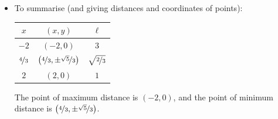 \begin{eg}
\begin{itemize}
\item To summarise (and giving distances and coordinates of points):
\begin{center}
           \renewcommand{\arraystretch}{1.5}
     \begin{tabular}{|c|c|c|}
          \hline
                  $x$ &  $(x,y)$ &  $\ell$
           \\ \hline
               $-2$ & $(-2,0)$ & $3$
           \\ \hline
               $\nicefrac{4}{3}$
                   & $\big(\nicefrac{4}{3},\pm\nicefrac{\sqrt{5}}{3}\big)$
                   & $\sqrt{\nicefrac{2}{3}}$
           \\ \hline
               $2$ & $(2,0)$ & $1$
           \\ \hline
     \end{tabular}
           \renewcommand{\arraystretch}{1}
\end{center}
The point of maximum distance is $(-2,0)$, and the point of minimum distance is
$\left(\nicefrac{4}{3},\pm\nicefrac{\sqrt{5}}{3}\right)$.
\end{itemize}

\end{eg}


